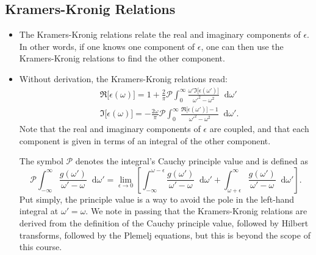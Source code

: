 \documentclass[11pt, a4paper]{article}
\newcommand{\diff}{\mathop{}\!\mathrm{d}} %
\begin{document}
\subsection{Kramers-Kronig Relations}
\begin{itemize}
    \item The Kramers-Kronig relations relate the real and imaginary components of $ \epsilon $. In other words, if one knows one component of $ \epsilon $, one can then use the Kramers-Kronig relations to find the other component.

    \item Without derivation, the Kramers-Kronig relations read:
    \begin{align*}
        & \Re \big[\epsilon(\omega)\big ] = 1 + \frac{2}{\pi} \mathcal{P} \int_{0}^{\infty} \frac{\omega' \Im \big[ \epsilon(\omega') \big]}{\omega'^{2} - \omega^{2}} \diff \omega'\\
        & \Im \big[ \epsilon(\omega) \big] = - \frac{2\omega}{\pi} \mathcal{P} \int_{0}^{\infty} \frac{ \Re \big[ \epsilon(\omega')  \big]- 1}{\omega'^{2} - \omega^{2}} \diff \omega'.
    \end{align*}
    Note that the real and imaginary components of $ \epsilon $ are coupled, and that each component is given in terms of an integral of the other component.

    The symbol $ \mathcal{P} $ denotes the integral's Cauchy principle value and is defined as 
    \begin{equation*}
        \mathcal{P}\int_{-\infty}^{\infty} \frac{g(\omega')}{\omega' - \omega} \diff \omega' = \lim_{\epsilon \to 0} \left[ \int_{-\infty}^{\omega-\epsilon} \frac{g(\omega')}{\omega'-\omega}\diff \omega' + \int_{\omega+\epsilon}^{\infty} \frac{g(\omega')}{\omega'-\omega}\diff \omega' \right].
    \end{equation*}
    Put simply, the principle value is a way to avoid the pole in the left-hand integral at $ \omega' = \omega $. We note in passing that the Kramers-Kronig relations are derived from the definition of the Cauchy principle value, followed by Hilbert transforms, followed by the Plemelj equations, but this is beyond the scope of this course.

\end{itemize}
\end{document}
